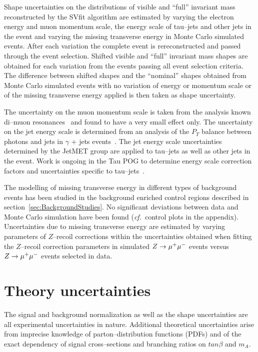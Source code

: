 Shape uncertainties on the distributions of visible and ``full'' invariant mass
reconstructed by the SVfit algorithm are estimated by varying the electron
energy and muon momentum scale, the energy scale of tau--jets and other jets in
the event and varying the missing transverse energy in Monte Carlo simulated
events.  After each variation the complete event is rereconstructed and passed
through the event selection.  Shifted visible and ``full'' invariant mass shapes
are obtained for each variation from the events passing all event selection
criteria.  The difference between shifted shapes and the ``nominal'' shapes
obtained from Monte Carlo simulated events with no variation of energy or
momentum scale or of the missing transverse energy applied is then taken as
shape uncertainty.

The uncertainty on the muon momentum scale is taken from the analysis known di--muon resonances~\cite{CMS_AN_2010-059}
and found to have a very small effect only.
The uncertainty on the jet energy scale is determined from an analysis of the $P_{T}$ balance between photons and jets
in $\gamma$ + jets events~\cite{JME-10-010}.
The jet energy scale uncertainties determined by the JetMET group are applied to tau--jets as well as other jets in the event.
Work is ongoing in the Tau POG to determine energy scale correction factors and uncertainties 
specific to tau--jets~\cite{tauJetEnergyCorrections}.

The modelling of missing transverse energy in different types of background
events has been studied in the background enriched control regions described in
section~\ref{sec:BackgroundStudies}.  No significant deviations between data and
Monte Carlo simulation have been found ({\it cf.}\ control plots in the
appendix).  Uncertainties due to missing transverse energy are estimated by
varying parameters of $Z$--recoil corrections within the uncertainties obtained
when fitting the $Z$--recoil correction parameters in simulated $Z \to \mu^+\mu^-$
events versus $Z \to \mu^+\mu^-$ events selected in data.


\section{Theory uncertainties}

The signal and background normalization as well as the shape uncertainties are
all experimental uncertainties in nature.  Additional theoretical uncertainties
arise from imprecise knowledge of parton--distribution functions (PDFs) and of
the exact dependency of signal cross--sections and branching ratios on
$tan\beta$ and $m_A$.

